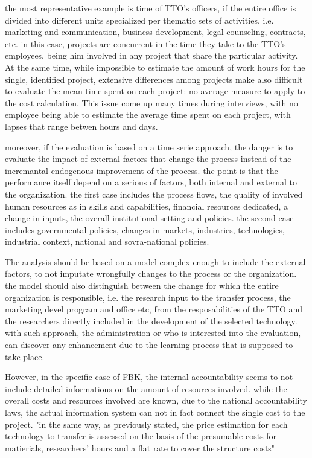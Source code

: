 the most representative example is time of TTO's officers, if the entire office is divided into different units specialized per thematic sets of activities, i.e. marketing and communication, business development, legal counseling, contracts, etc. in this case, projects are concurrent in the time they take to the TTO's employees, being him involved in any project that share the particular activity. At the same time, while impossible to estimate the amount of work hours for the single, identified project, extensive differences among projects make also difficult to evaluate the mean time spent on each project: no average measure to apply to the cost calculation. This issue come up many times during interviews, with no employee being able to estimate the average time spent on each project, with lapses that range betwen hours and days.

moreover, if the evaluation is based on a time serie approach, the danger is to evaluate the impact of external factors that change the process instead of the incremantal endogenous improvement of the process. the point is that the performance itself depend on a serious of factors, both internal and external to the organization. the first case includes the process flows, the quality of involved human resources as in skills and capabilities, financial resources dedicated, a change in inputs, the overall institutional setting and policies. the second case includes governmental policies, changes in markets, industries, technologies, industrial context, national and sovra-national policies. 

The analysis should be based on a model complex enough to include the external factors, to not imputate wrongfully changes to the process or the organization. the model should also distinguish between the change for which the entire organization is responsible, i.e. the research input to the transfer process, the marketing devel program and office etc, from the resposabilities of the TTO and the researchers directly included in the development of the selected technology. with such approach, the administration or who is interested into the evaluation, can discover any enhancement due to the learning process that is supposed to take place. 

However, in the specific case of FBK, the internal accountability seems to not include detailed informations on the amount of resources involved. while the overall costs and resources involved are known, due to the national accountability laws, the actual information system can not in fact connect the single cost to the project. "in the same way, as previously stated, the price estimation for each technology to transfer is assessed on the basis of the presumable costs for matierials, researchers' hours and a flat rate to cover the structure costs"

